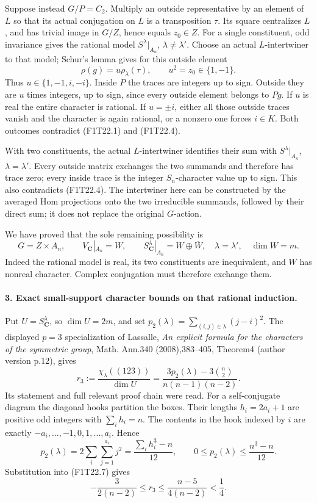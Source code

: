 Suppose instead \(G/P=C_2\). Multiply an outside
representative by an element of \(L\) so that its
actual conjugation on \(L\) is a transposition
\(\tau\). Its square centralizes \(L\), and has
trivial image in \(G/Z\), hence equals
\(z_0\in Z\). For a single constituent, odd
invariance gives the rational model
\(S^\lambda|_{A_n}\), \(\lambda\ne\lambda'\).
Choose an actual \(L\)-intertwiner to that model;
Schur's lemma gives for this outside element
\[
       \rho(g)=u\rho_\lambda(\tau),\qquad
       u^2=z_0\in\{1,-1\}.
 \tag{F1T22.5}
\]
Thus \(u\in\{1,-1,i,-i\}\). Inside \(P\)
the traces are integers up to sign. Outside they are
\(u\) times integers, up to sign, since every outside
element belongs to \(Pg\). If \(u\) is real the
entire character is rational. If \(u=\pm i\),
either all those outside traces vanish and the character
is again rational, or a nonzero one forces \(i\in K\).
Both outcomes contradict (F1T22.1) and (F1T22.4).

With two constituents, the actual \(L\)-intertwiner
identifies their sum with
\(S^\lambda|_{A_n}\), \(\lambda=\lambda'\).
Every outside matrix exchanges the two summands and
therefore has trace zero; every inside trace is the
integer \(S_n\)-character value up to sign. This also
contradicts (F1T22.4). The intertwiner here can be
constructed by the averaged Hom projections onto the
two irreducible summands, followed by their direct sum;
it does not replace the original \(G\)-action.

We have proved that the sole remaining possibility is
\[
 G=Z\times A_n,\qquad V_{\mathbf C}|_{A_n}=W,
 \qquad
 S^\lambda_{\mathbf C}|_{A_n}=W\oplus\overline W,
 \quad\lambda=\lambda',\quad \dim W=m.
 \tag{F1T22.6}
\]
Indeed the rational model is real, its two constituents
are inequivalent, and \(W\) has nonreal character.
Complex conjugation must therefore exchange them.

\paragraph{3. Exact small-support character bounds on that rational induction.}
Put \(U=S^\lambda_{\mathbf C}\), so \(\dim U=2m\),
and set
\(p_2(\lambda)=\sum_{(i,j)\in\lambda}(j-i)^2\).
The displayed \(p=3\) specialization of Lassalle,
\emph{An explicit formula for the characters of the
symmetric group}, Math. Ann.340 (2008),383--405,
Theorem4 (author version p.12), gives
\[
 r_3:=\frac{\chi_\lambda((123))}{\dim U}
   =\frac{3p_2(\lambda)-3\binom n2}
                {n(n-1)(n-2)}.
 \tag{F1T22.7}
\]
Its statement and full relevant proof chain were read.
For a self-conjugate diagram the diagonal hooks partition
the boxes. Their lengths \(h_i=2a_i+1\) are positive
odd integers with \(\sum_i h_i=n\). The contents
in the hook indexed by \(i\) are exactly
\(-a_i,\ldots,-1,0,1,\ldots,a_i\). Hence
\[
 p_2(\lambda)=2\sum_i\sum_{j=1}^{a_i}j^2
             =\frac{\sum_i h_i^3-n}{12},
 \qquad
 0\le p_2(\lambda)\le\frac{n^3-n}{12}.
 \tag{F1T22.8}
\]
Substitution into (F1T22.7) gives
\[
 -\frac3{2(n-2)}\le r_3
      \le\frac{n-5}{4(n-2)}<\frac14.
 \tag{F1T22.9}
\]

